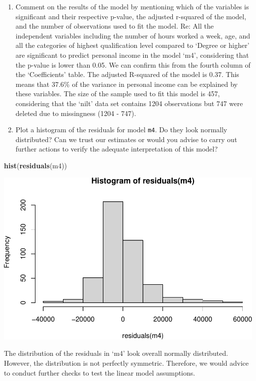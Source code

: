 \documentclass[
]{book}
\newenvironment{Shaded}{\begin{snugshade}}{\end{snugshade}}
\newcommand{\FunctionTok}[1]{\textcolor[rgb]{0.13,0.29,0.53}{\textbf{#1}}}
\newcommand{\NormalTok}[1]{#1}
\providecommand{\tightlist}{%
  \setlength{\itemsep}{0pt}\setlength{\parskip}{0pt}}
\begin{document}
\begin{enumerate}
\def\labelenumi{\arabic{enumi}.}
\setcounter{enumi}{4}
\tightlist
\item
  Comment on the results of the model by mentioning which of the variables is significant and their respective p-value, the adjusted r-squared of the model, and the number of observations used to fit the model.
  Re: All the independent variables including the number of hours worked a week, age, and all the categories of highest qualification level compared to `Degree or higher' are significant to predict personal income in the model `m4', considering that the p-value is lower than 0.05. We can confirm this from the fourth column of the `Coefficients' table. The adjusted R-squared of the model is 0.37. This means that 37.6\% of the variance in personal income can be explained by these variables. The size of the sample used to fit this model is 457, considering that the `nilt' data set contains 1204 observations but 747 were deleted due to missingness (1204 - 747).
\item
  Plot a histogram of the residuals for model \texttt{m4}. Do they look normally distributed? Can we trust our estimates or would you advise to carry out further actions to verify the adequate interpretation of this model?
\end{enumerate}

\begin{Shaded}
\begin{Highlighting}[]
\FunctionTok{hist}\NormalTok{(}\FunctionTok{residuals}\NormalTok{(m4))}
\end{Highlighting}
\end{Shaded}

\begin{flushleft}\includegraphics[width=1\linewidth]{lab-workbook_files/figure-latex/unnamed-chunk-146-1} \end{flushleft}

The distribution of the residuals in `m4' look overall normally distributed. However, the distribution is not perfectly symmetric. Therefore, we would advice to conduct further checks to test the linear model assumptions.

  
\end{document}
